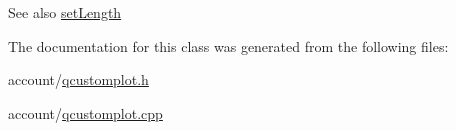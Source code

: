 \begin{DoxySeeAlso}{\-See also}
\hyperlink{classQCPLineEnding_ae36fa01763751cd64b7f56c3507e935a}{set\-Length} 
\end{DoxySeeAlso}


\-The documentation for this class was generated from the following files\-:\begin{DoxyCompactItemize}
\item 
account/\hyperlink{qcustomplot_8h}{qcustomplot.\-h}\item 
account/\hyperlink{qcustomplot_8cpp}{qcustomplot.\-cpp}\end{DoxyCompactItemize}
